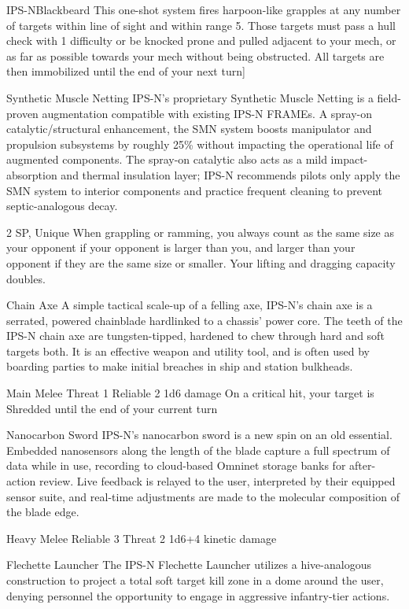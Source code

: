 \begin{mech}{IPS-N}{Blackbeard}
{This one-shot system fires harpoon-like grapples at any number of targets within line of sight and within range 5. Those targets must pass a hull check with 1 difficulty or be knocked prone and pulled adjacent to your mech, or as far as possible towards your mech without being obstructed. All targets are then immobilized until the end of your next turn}]


Synthetic Muscle Netting
IPS-N’s proprietary Synthetic Muscle Netting is a field-proven augmentation compatible with existing IPS-N FRAMEs. A spray-on catalytic/structural enhancement, the SMN system boosts manipulator and propulsion subsystems by roughly 25\% without impacting the operational life of augmented components. The spray-on catalytic also acts as a mild impact-absorption and thermal insulation layer; IPS-N recommends pilots only apply the SMN system to interior components and practice frequent cleaning to prevent septic-analogous decay.

2 SP, Unique
When grappling or ramming, you always count as the same size as your opponent if your opponent is larger than you, and larger than your opponent if they are the same size or smaller. Your lifting and dragging capacity doubles.

Chain Axe
A simple tactical scale-up of a felling axe, IPS-N’s chain axe is a serrated, powered chainblade hardlinked to a chassis’ power core. The teeth of the IPS-N chain axe are tungsten-tipped, hardened to chew through hard and soft targets both. It is an effective weapon and utility tool, and is often used by boarding parties to make initial breaches in ship and station bulkheads.

Main Melee
Threat 1
Reliable 2
1d6 damage
On a critical hit, your target is Shredded until the end of your current turn

Nanocarbon Sword
IPS-N’s nanocarbon sword is a new spin on an old essential. Embedded nanosensors along the length of the blade capture a full spectrum of data while in use, recording to cloud-based Omninet storage banks for after-action review. Live feedback is relayed to the user, interpreted by their equipped sensor suite, and real-time adjustments are made to the molecular composition of the blade edge.

Heavy Melee
Reliable 3
Threat 2
1d6+4 kinetic damage

Flechette Launcher
The IPS-N Flechette Launcher utilizes a hive-analogous construction to project a total soft target kill zone in a dome around the user, denying personnel the opportunity to engage in aggressive infantry-tier actions.


\end{mech}

